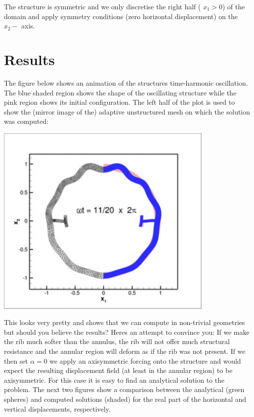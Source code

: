 The structure is symmetric and we only discretise the right half ( $ x_1 > 0 $) of the domain and apply symmetry conditions (zero horizontal displacement) on the $ x_2-$ axis.



 

\hypertarget{index_results}{}\section{Results}\label{index_results}
The figure below shows an animation of the structure\textquotesingle{}s time-\/harmonic oscillation. The blue shaded region shows the shape of the oscillating structure while the pink region shows its initial configuration. The left half of the plot is used to show the (mirror image of the) adaptive unstructured mesh on which the solution was computed\+:

 
\begin{DoxyImage}
\includegraphics[width=0.8\textwidth]{all}
\end{DoxyImage}


This looks very pretty and shows that we can compute in non-\/trivial geometries but should you believe the results? Here\textquotesingle{}s an attempt to convince you\+: If we make the rib much softer than the annulus, the rib will not offer much structural resistance and the annular region will deform as if the rib was not present. If we then set $ \alpha = 0 $ we apply an axisymmetric forcing onto the structure and would expect the resulting displacement field (at least in the annular region) to be axisymmetric. For this case it is easy to find an analytical solution to the problem. The next two figures show a comparison between the analytical (green spheres) and computed solutions (shaded) for the real part of the horizontal and vertical displacements, respectively.

